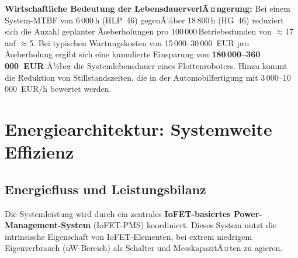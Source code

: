 ﻿\documentclass[a4paper,12pt]{scrreprt}
\theoremstyle{definition}
\begin{document}
\begin{infobox}
\textbf{Wirtschaftliche Bedeutung der LebensdauerverlÃ¤ngerung:}
Bei einem System-MTBF von 6\,000\,h (HLP~46) gegenÃ¼ber 18\,800\,h (HG~46)
reduziert sich die Anzahl geplanter Ãœberholungen pro 100\,000\,Betriebs\-stunden
von $\approx$17 auf $\approx$5. Bei typischen Wartungskosten von
15\,000--30\,000~EUR pro Ãœberholung ergibt sich eine kumulierte Einsparung
von \textbf{180\,000--360\,000~EUR} Ã¼ber die Systemlebensdauer
eines Flottenroboters. Hinzu kommt die Reduktion von Stillstandszeiten,
die in der Automobilfertigung mit 3\,000--10\,000~EUR/h bewertet werden.
\end{infobox}

\section{Energiearchitektur: Systemweite Effizienz}

\subsection{Energiefluss und Leistungsbilanz}

Die Systemleistung wird durch ein zentrales \textbf{IoFET-basiertes
Power-Management-System} (IoFET-PMS) koordiniert. Dieses System
nutzt die intrinsische Eigenschaft von IoFET-Elementen, bei extrem
niedrigem Eigenverbrauch (\si{\nano\watt}-Bereich) als Schalter und
MesskapazitÃ¤ten zu agieren.
\end{document}
